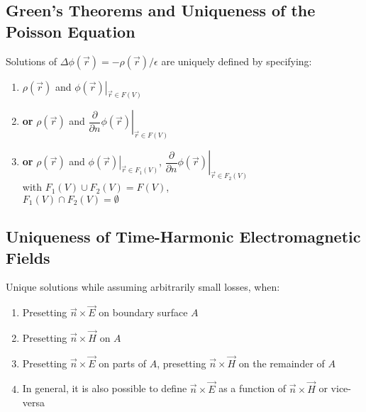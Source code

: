 \subsection{Green's Theorems and Uniqueness of the Poisson Equation}
Solutions of $\Delta\phi(\vec{r}) = -\rho(\vec{r})/\epsilon$ are uniquely defined by specifying:
\begin{enumerate}
\item $\rho(\vec{r})$ and $\left.\phi(\vec{r})\right|_{\vec{r}\in F(V)}$
\item \textbf{or} $\rho(\vec{r})$ and $\left.\dfrac{\partial}{\partial n}\phi(\vec{r})\right|_{\vec{r}\in F(V)}$
\item \textbf{or} $\rho(\vec{r})$ and $\left.\phi(\vec{r})\right|_{\vec{r}\in F_{1}(V)}$, $\left.\dfrac{\partial}{\partial n}\phi(\vec{r})\right|_{\vec{r}\in F_{2}(V)}$\\
        with $F_{1}(V) \cup F_{2}(V) = F(V)$,\\
        $F_{1}(V) \cap F_{2}(V) = \emptyset$
\end{enumerate}

\subsection{Uniqueness of Time-Harmonic Electromagnetic Fields}
Unique solutions while assuming arbitrarily small losses, when:
\begin{enumerate}
\item Presetting $\vec{n}\times\vec{E}$ on boundary surface $A$
\item Presetting $\vec{n}\times\vec{H}$ on $A$
\item Presetting $\vec{n}\times\vec{E}$ on parts of $A$, presetting $\vec{n}\times\vec{H}$ on the remainder of $A$
\item In general, it is also possible to define $\vec{n}\times\vec{E}$ as a function of $\vec{n}\times\vec{H}$ or vice-versa
\end{enumerate}

